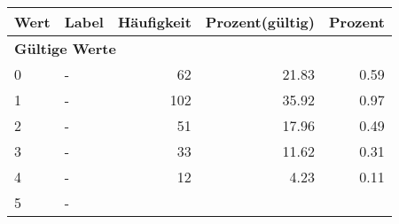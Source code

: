      \begin{longtable}{lXrrr}
     \toprule
     \textbf{Wert} & \textbf{Label} & \textbf{Häufigkeit} & \textbf{Prozent(gültig)} & \textbf{Prozent} \\
     \endhead
     \midrule
     \multicolumn{5}{l}{\textbf{Gültige Werte}}\\

     0 &
     \multicolumn{1}{X}{ -  } &


       \num{62} &
       \num[round-mode=places,round-precision=2]{21.83} &
         \num[round-mode=places,round-precision=2]{0.59} \\

     1 &
     \multicolumn{1}{X}{ -  } &


       \num{102} &
       \num[round-mode=places,round-precision=2]{35.92} &
         \num[round-mode=places,round-precision=2]{0.97} \\

     2 &
     \multicolumn{1}{X}{ -  } &


       \num{51} &
       \num[round-mode=places,round-precision=2]{17.96} &
         \num[round-mode=places,round-precision=2]{0.49} \\

     3 &
     \multicolumn{1}{X}{ -  } &


       \num{33} &
       \num[round-mode=places,round-precision=2]{11.62} &
         \num[round-mode=places,round-precision=2]{0.31} \\

     4 &
     \multicolumn{1}{X}{ -  } &


       \num{12} &
       \num[round-mode=places,round-precision=2]{4.23} &
         \num[round-mode=places,round-precision=2]{0.11} \\

     5 &
     \multicolumn{1}{X}{ -  } &



\end{longtable}
